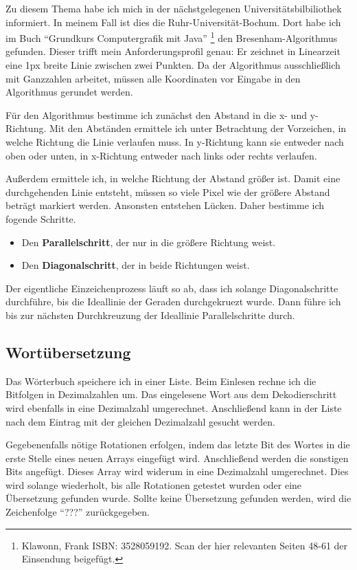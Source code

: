 	Zu diesem Thema habe ich mich in der nächstgelegenen Universitätsbilbiliothek informiert. In meinem Fall ist dies die Ruhr-Universität-Bochum. Dort habe ich im Buch "`Grundkurs Computergrafik mit Java"' \footnote{Klawonn, Frank ISBN: 3528059192. Scan der hier relevanten Seiten 48-61 der Einsendung beigefügt.} den Bresenham-Algorithmus gefunden. Dieser trifft mein Anforderungsprofil genau: Er zeichnet in Linearzeit eine 1px breite Linie zwischen zwei Punkten. Da der Algorithmus ausschließlich mit Ganzzahlen arbeitet, müssen alle Koordinaten vor Eingabe in den Algorithmus gerundet werden.

Für den Algorithmus bestimme ich zunächst den Abstand in die x- und y-Richtung. Mit den Abständen ermittele ich unter Betrachtung der Vorzeichen, in welche Richtung die Linie verlaufen muss. In y-Richtung kann sie entweder nach oben oder unten, in x-Richtung entweder nach links oder rechts verlaufen.

Außerdem ermittele ich, in welche Richtung der Abstand größer ist.
Damit eine durchgehenden Linie entsteht, müssen so viele Pixel wie der größere Abstand beträgt markiert werden. Ansonsten entstehen Lücken. Daher bestimme ich fogende Schritte.
\begin{itemize}
	\item Den \textbf{Parallelschritt}, der nur in die größere Richtung weist. 
	\item Den \textbf{Diagonalschritt}, der in beide Richtungen weist.
\end{itemize}

Der eigentliche Einzeichenprozess läuft so ab, dass ich solange Diagonalschritte durchführe, bis die Ideallinie der Geraden durchgekruezt wurde. Dann führe ich bis zur nächsten Durchkreuzung der Ideallinie Parallelschritte durch. 

\subsection{Wortübersetzung}
Das Wörterbuch speichere ich in einer Liste. Beim Einlesen rechne ich die Bitfolgen in Dezimalzahlen um.
Das eingelesene Wort aus dem Dekodierschritt wird ebenfalls in eine Dezimalzahl umgerechnet. Anschließend kann in der Liste nach dem Eintrag mit der gleichen Dezimalzahl gesucht werden.

Gegebenenfalls nötige Rotationen erfolgen, indem das letzte Bit des Wortes in die erste Stelle eines neuen Arrays eingefügt wird. Anschließend werden die sonstigen Bits angefügt. Dieses Array wird widerum in eine Dezimalzahl umgerechnet. Dies wird solange wiederholt, bis alle Rotationen getestet wurden oder eine Übersetzung gefunden wurde.
Sollte keine Übersetzung gefunden werden, wird die Zeichenfolge "`???"' zurückgegeben. 

